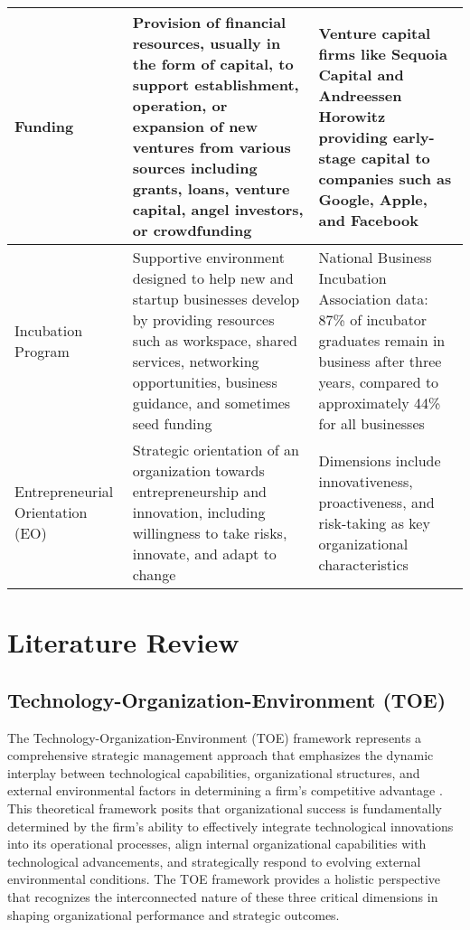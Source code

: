 \documentclass[../Main.tex]{subfiles}
\begin{document}
\begin{longtable}{|p{2.5cm}|p{6cm}|p{5cm}|}
Funding & Provision of financial resources, usually in the form of capital, to support establishment, operation, or expansion of new ventures from various sources including grants, loans, venture capital, angel investors, or crowdfunding \autocite{bruneel2010funding, lerner2018venture} & Venture capital firms like Sequoia Capital and Andreessen Horowitz providing early-stage capital to companies such as Google, Apple, and Facebook \autocite{lerner2012venture} \\
\hline
Incubation Program & Supportive environment designed to help new and startup businesses develop by providing resources such as workspace, shared services, networking opportunities, business guidance, and sometimes seed funding \autocite{hackett2004business,europeancommission2014incubators} & National Business Incubation Association data: 87\% of incubator graduates remain in business after three years, compared to approximately 44\% for all businesses \autocite{NBIA2012} \\
\hline
Entrepreneurial Orientation (EO) & Strategic orientation of an organization towards entrepreneurship and innovation, including willingness to take risks, innovate, and adapt to change \autocite{wiklund2005entrepreneurial} & Dimensions include innovativeness, proactiveness, and risk-taking as key organizational characteristics \\
\hline
\end{longtable}

\section{Literature Review}
\subsection{Technology-Organization-Environment (TOE)}

The Technology-Organization-Environment (TOE) framework represents a comprehensive strategic management approach that emphasizes the dynamic interplay between technological capabilities, organizational structures, and external environmental factors in determining a firm's competitive advantage \autocite{toer}. This theoretical framework posits that organizational success is fundamentally determined by the firm's ability to effectively integrate technological innovations into its operational processes, align internal organizational capabilities with technological advancements, and strategically respond to evolving external environmental conditions. The TOE framework provides a holistic perspective that recognizes the interconnected nature of these three critical dimensions in shaping organizational performance and strategic outcomes.
\end{document}
